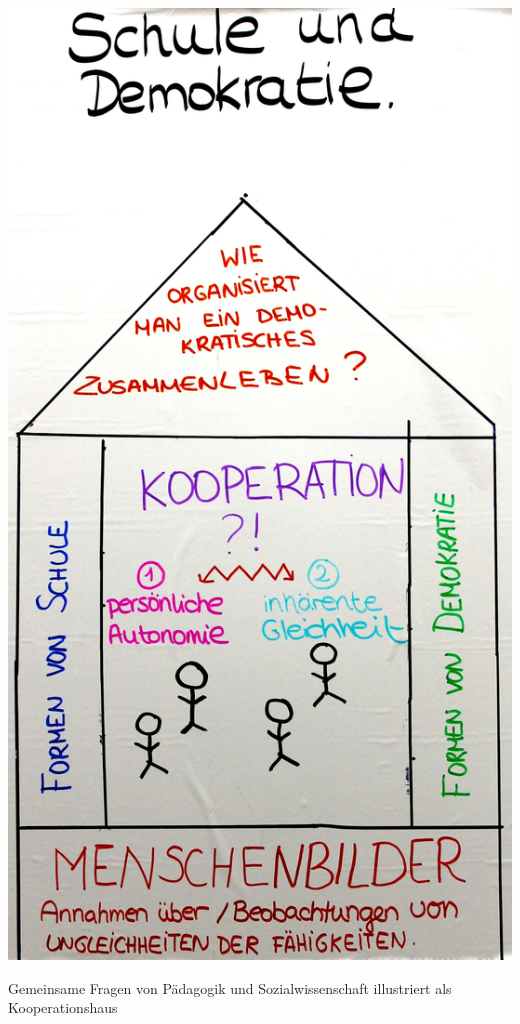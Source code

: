 \begin{dsafigure}
	\begin{center}
	\includegraphics[width=1\columnwidth]{img/Kooperationshaus.JPG}
	\caption{Gemeinsame Fragen von Pädagogik und Sozialwissenschaft illustriert als Kooperationshaus}
	\label{fig:kooperationshaus}
	\end{center}
\end{dsafigure}

